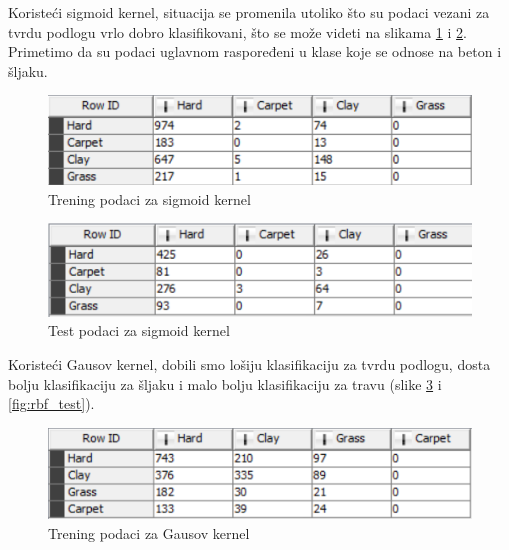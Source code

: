 \documentclass[a4paper]{article}
\begin{document}

Koristeći sigmoid kernel, situacija se promenila utoliko što su podaci vezani za tvrdu podlogu
vrlo dobro klasifikovani, što se može videti na slikama \ref{fig:sigmoid_training} i \ref{fig:sigmoid_test}.
Primetimo da su podaci uglavnom raspoređeni u klase koje se odnose na beton i šljaku.

\begin{figure}[h!]
	\begin{center}
		\includegraphics[scale=0.80]{KNIME_project/SVM/sigmoid_training}
	\end{center}
	\caption{Trening podaci za sigmoid kernel}
	\label{fig:sigmoid_training}
\end{figure}

\begin{figure}[h!]
	\begin{center}
		\includegraphics[scale=0.80]{KNIME_project/SVM/sigmoid_test}
	\end{center}
	\caption{Test podaci za sigmoid kernel}
	\label{fig:sigmoid_test}
\end{figure}

Koristeći Gausov kernel, dobili smo lošiju klasifikaciju za tvrdu podlogu, dosta bolju klasifikaciju za šljaku
i malo bolju klasifikaciju za travu (slike \ref{fig:rbf_training} i \ref{fig:rbf_test}). \\

\begin{figure}[h!]
	\begin{center}
		\includegraphics[scale=0.80]{KNIME_project/SVM/rbf_training}
	\end{center}
	\caption{Trening podaci za Gausov kernel}
	\label{fig:rbf_training}
\end{figure}
\end{document}

